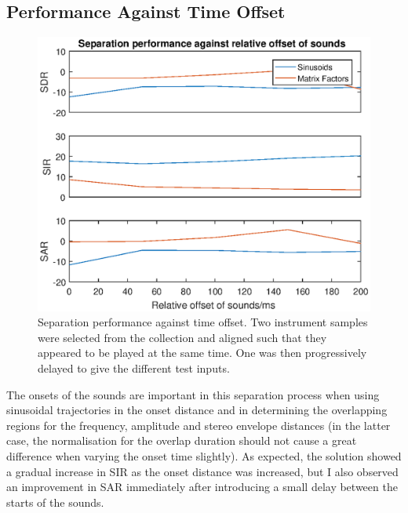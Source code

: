 \documentclass[10pt,twoside,a4paper]{report}
\begin{document}
\subsection{Performance Against Time Offset}


\begin{figure}
\centering
\includegraphics[width=0.7\linewidth]{./OffsetPlot}
\caption{Separation performance against time offset. Two instrument samples were selected from the collection and aligned such that they appeared to be played at the same time. One was then progressively delayed to give the different test inputs.}
\label{fig:OffsetPlot}
\end{figure}

The onsets of the sounds are important in this separation process when using sinusoidal trajectories in the onset distance and in determining the overlapping regions for the frequency, amplitude and stereo envelope distances (in the latter case, the normalisation for the overlap duration should not cause a great difference when varying the onset time slightly). As expected, the solution showed a gradual increase in SIR as the onset distance was increased, but I also observed an improvement in SAR immediately after introducing a small delay between the starts of the sounds.



\end{document}
